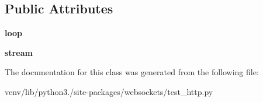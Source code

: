 \subsection*{Public Attributes}
\begin{DoxyCompactItemize}
\item 
\mbox{\label{classwebsockets_1_1test__http_1_1_h_t_t_p_async_tests_aad6e4da3719ac70ac22b752680c1e5fe}} 
{\bfseries loop}
\item 
\mbox{\label{classwebsockets_1_1test__http_1_1_h_t_t_p_async_tests_a3ba527ad448e96f6ec4f41ddc1a62c24}} 
{\bfseries stream}
\end{DoxyCompactItemize}


The documentation for this class was generated from the following file\+:\begin{DoxyCompactItemize}
\item 
venv/lib/python3./site-\/packages/websockets/test\+\_\+http.\+py\end{DoxyCompactItemize}
